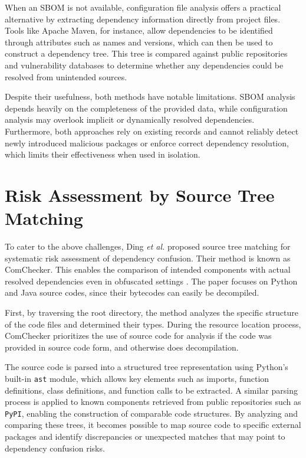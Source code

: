 When an SBOM is not available, configuration file analysis offers a practical alternative by extracting dependency information directly from project files. Tools like Apache Maven, for instance, allow dependencies to be identified through attributes such as names and versions, which can then be used to construct a dependency tree. This tree is compared against public repositories and vulnerability databases to determine whether any dependencies could be resolved from unintended sources.

Despite their usefulness, both methods have notable limitations. SBOM analysis depends heavily on the completeness of the provided data, while configuration analysis may overlook implicit or dynamically resolved dependencies. Furthermore, both approaches rely on existing records and cannot reliably detect newly introduced malicious packages or enforce correct dependency resolution, which limits their effectiveness when used in isolation.

\section{Risk Assessment by Source Tree Matching}

To cater to the above challenges, Ding \textit{et al.} proposed source tree matching for systematic risk assessment of dependency confusion. Their method is known as ComChecker. This enables the comparison of intended components with actual resolved dependencies even in obfuscated settings \citep{ding2024dependency}. The paper focuses on Python and Java source codes, since their bytecodes can easily be decompiled.

First, by traversing the root directory, the method analyzes the specific structure of the code files and determined their types. During the resource location process, ComChecker prioritizes the use of source code for analysis if the code was provided in source code form, and otherwise does decompilation.

The source code is parsed into a structured tree representation using Python's built-in \texttt{ast} module, which allows key elements such as imports, function definitions, class definitions, and function calls to be extracted. A similar parsing process is applied to known components retrieved from public repositories such as \texttt{PyPI}, enabling the construction of comparable code structures. By analyzing and comparing these trees, it becomes possible to map source code to specific external packages and identify discrepancies or unexpected matches that may point to dependency confusion risks.

